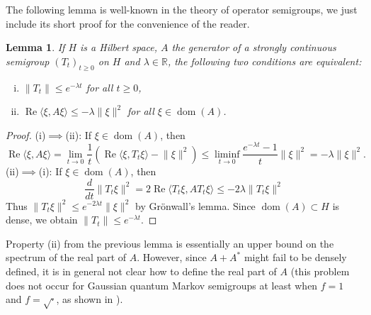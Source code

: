 \documentclass[a4paper,12pt]{amsart}
\newcommand{\norm}[1]{\lVert#1\rVert}
\newcommand{\dom}{\operatorname{dom}}
\newcommand{\IR}{\mathbb R}
\theoremstyle{plain}
\newtheorem{lemma}[proposition]{Lemma}
\theoremstyle{remark}
\theoremstyle{definition}
\begin{document}
The following lemma is well-known in the theory of operator semigroups, we just include its short proof for the convenience of the reader.
\begin{lemma}\label{lem:exp_decay}
    If $H$ is a Hilbert space, $A$ the generator of a strongly continuous semigroup $(T_t)_{t\geq 0}$ on $H$ and $\lambda\in \IR$, the following two conditions are equivalent:
    \begin{enumerate}[(i)]
        \item $\norm{T_t}\leq e^{-\lambda t}$ for all $t\geq 0$,
        \item $\operatorname{Re}\langle\xi,A\xi\rangle\leq -\lambda\norm{\xi}^2$ for all $\xi\in \dom(A)$.
    \end{enumerate}
\end{lemma}
\begin{proof}
    (i)$\implies$(ii): If $\xi\in \dom(A)$, then
    \begin{equation*}
        \operatorname{Re}\langle\xi,A\xi\rangle=\lim_{t\to 0}\frac 1 t(\operatorname{Re}\langle \xi,T_t\xi\rangle-\norm{\xi}^2)\leq\liminf_{t\to 0}\frac {e^{-\lambda t}-1}{t}\norm{\xi}^2=-\lambda\norm{\xi}^2.
    \end{equation*}
    (ii)$\implies$(i): If $\xi\in\dom(A)$, then
    \begin{equation*}
        \frac{d}{dt}\norm{T_t\xi}^2=2\operatorname{Re}\langle T_t\xi,A T_t\xi\rangle\leq -2\lambda\norm{T_t\xi}^2
    \end{equation*}
    Thus $\norm{T_t\xi}^2\leq e^{-2\lambda t}\norm{\xi}^2$ by Grönwall's lemma. Since $\dom(A)\subset H$ is dense, we obtain $\norm{T_t}\leq e^{-\lambda t}$.
\end{proof}

Property (ii) from the previous lemma is essentially an upper bound on the spectrum of the real part of $A$. However, since $A+A^\ast$ might fail to be densely defined, it is in general not clear how to define the real part of $A$ (this problem does not occur for Gaussian quantum Markov semigroups at least when $f=1$ and $f=\sqrt\cdot$, as shown in \cite[Lemma 4.12]{FL25}).
\end{document}
